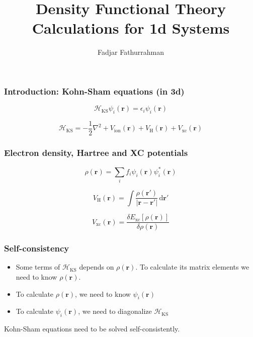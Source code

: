 



\title{Density Functional Theory Calculations for 1d Systems}
\author{Fadjar Fathurrahman}
\date{}


\frame{\titlepage}


\begin{frame}
\frametitle{Introduction: Kohn-Sham equations (in 3d)}

\begin{equation*}
\mathcal{H}_{\mathrm{KS}} \psi_{i}(\mathbf{r}) = \epsilon_{i} \psi_{i}(\mathbf{r})
\end{equation*}

\begin{equation*}
\mathcal{H}_{\mathrm{KS}} =
-\frac{1}{2} \nabla^2 +
V_{\mathrm{ion}}(\mathbf{r}) +
V_{\mathrm{H}}(\mathbf{r}) + V_{\mathrm{xc}}(\mathbf{r})
\end{equation*}

\end{frame}


\begin{frame}
\frametitle{Electron density, Hartree and XC potentials}

\begin{equation*}
\rho(\mathbf{r}) = \sum_{i} f_{i} \psi_{i}(\mathbf{r}) \psi^{*}_{i}(\mathbf{r}) 
\end{equation*}

\begin{equation*}
V_{\mathrm{H}}(\mathbf{r}) = \int \frac{\rho(\mathbf{r}')}{\left| \mathbf{r} - \mathbf{r}' \right|}
\,\mathrm{d}\mathbf{r}'
\end{equation*}

\begin{equation*}
V_{\mathrm{xc}}(\mathbf{r}) = \frac{\delta E_{\mathrm{xc}}[\rho(\mathbf{r})]}%
{\delta \rho(\mathbf{r})}
\end{equation*}

\end{frame}



\begin{frame}
\frametitle{Self-consistency}

\begin{itemize}
\item Some terms of $\mathcal{H}_{\mathrm{KS}}$ depends on $\rho(\mathbf{r})$.
To calculate its matrix elements we need to know $\rho(\mathbf{r})$.
\item To calculate $\rho(\mathbf{r})$, we need to know $\psi_{i}(\mathbf{r})$
\item To calculate $\psi_{i}(\mathbf{r})$, we need to diagonalize $\mathcal{H}_{\mathrm{KS}}$
\end{itemize}

Kohn-Sham equations need to be solved self-consistently.

\end{frame}



